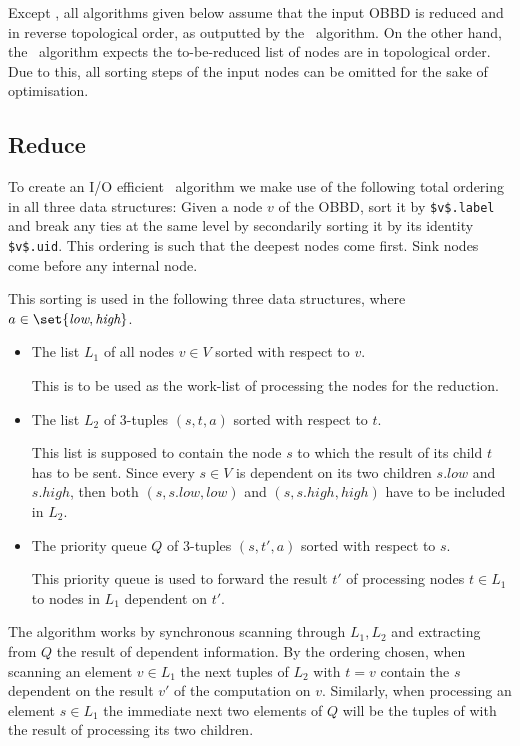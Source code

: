 Except \Reduce, all algorithms given below assume that the input OBBD is reduced
and in reverse topological order, as outputted by the \Reduce\ algorithm. On the
other hand, the \Reduce\ algorithm expects the to-be-reduced list of nodes are
in topological order. Due to this, all sorting steps of the input nodes can
be omitted for the sake of optimisation. \cite{Arge96}

\subsection{Reduce} \label{sec:theory_reduce}
To create an I/O efficient \Reduce\ algorithm we make use of the following total
ordering in all three data structures: Given a node $v$ of the OBBD, sort it by
\lstinline{$v$.label} and break any ties at the same level by secondarily
sorting it by its identity \lstinline{$v$.uid}. This ordering is such that the
deepest nodes come first. Sink nodes come before any internal node.

This sorting is used in the following three data structures, where $a \in
\set{\textit{low}, \textit{high}}$.

\begin{itemize}
\item The list $L_1$ of all nodes $v \in V$ sorted with respect to $v$.

  This is to be used as the work-list of processing the nodes for the reduction.

\item The list $L_2$ of 3-tuples $(s,t,a)$ sorted with respect to $t$.

  This list is supposed to contain the node $s$ to which the result of its child
  $t$ has to be sent. Since every $s \in V$ is dependent on its two children
  $s.\mathit{low}$ and $s.\mathit{high}$, then both $(s, s.\mathit{low},
  \mathit{low})$ and $(s, s.\mathit{high}, \mathit{high})$ have to be included
  in $L_2$.

\item The priority queue $Q$ of 3-tuples $(s,t',a)$ sorted with respect to $s$.

  This priority queue is used to forward the result $t'$ of processing nodes $t
  \in L_1$ to nodes in $L_1$ dependent on $t'$.
\end{itemize}

The algorithm works by synchronous scanning through $L_1, L_2$ and extracting
from $Q$ the result of dependent information. By the ordering chosen, when
scanning an element $v \in L_1$ the next tuples of $L_2$ with $t = v$ contain
the $s$ dependent on the result $v'$ of the computation on $v$. Similarly, when
processing an element $s \in L_1$ the immediate next two elements of $Q$ will be
the tuples of with the result of processing its two children.

